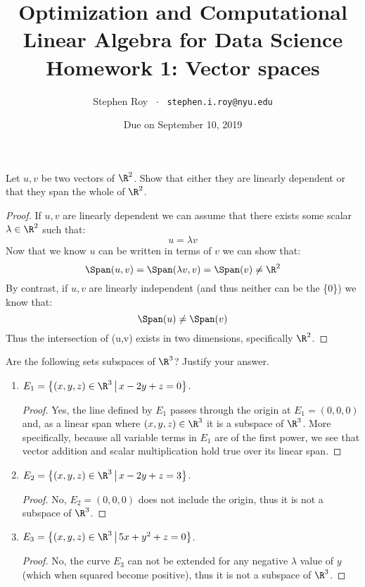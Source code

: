 \documentclass[11pt,nocut]{article}
\title{\vspace{-2.0cm}%
	Optimization and Computational Linear Algebra for Data Science\\
Homework 1: Vector spaces}
\author{\vspace{1cm}Stephen Roy \ $\cdot$ \ \texttt{stephen.i.roy@nyu.edu}}
\date{\vspace{-1cm}Due on September 10, 2019}
\begin{document}
\maketitle



\begin{problem}[2 points]
	Let $u,v$ be two vectors of $\R^2$. Show that either they are linearly dependent or that they span the whole of $\R^2$.
\end{problem}
\begin{proof}
If $u,v$ are linearly dependent we can assume that there exists some scalar $\lambda \in \R^2$ such that:
$$
u = \lambda v
$$
Now that we know $u$ can be written in terms of $v$ we can show that:
$$
\Span(u,v) = \Span(\lambda v,v) = \Span(v) \neq\R^2
$$
By contrast, if $u,v$ are linearly independent (and thus neither can be the \{0\}) we know that:
$$
\Span(u) \neq \Span(v)
$$
Thus the intersection of \Span(u,v) exists in two dimensions, specifically $\R^2$.
\end{proof}	

\vspace{1mm}

\begin{problem}[3 points]
	Are the following sets subspaces of $\R^3$? Justify your answer.
	\begin{enumerate}[label=\normalfont(\textbf{\alph*})]
		\item $E_1= \big\{ (x,y,z) \in \R^3 \, \big| \, x - 2y + z= 0 \big\}$.\\
		\begin{proof} Yes, the line defined by $E_1$ passes through the origin at $E_1=(0,0,0)$ and, as a linear span where $(x,y,z)\in \R^3$ it is a subspace of $\R^3$. More specifically, because all variable terms in $E_1$ are of the first power, we see that vector addition and scalar multiplication hold true over its linear span.\end{proof}
		\item $E_2= \big\{ (x,y,z) \in \R^3 \, \big| \, x - 2y + z= 3 \big\}$.\\
		\begin{proof}No, $E_2=(0,0,0)$ does not include the origin, thus it is not a subspace of $\R^3$.\end{proof}
		\item $E_3= \big\{ (x,y,z) \in \R^3 \, \big| \, 5x + y^2 + z= 0 \big\}$.\\
		\begin{proof}No, the curve $E_3$ can not be extended for any negative $\lambda$ value of $y$ (which when squared become positive), thus it is not a subspace of $\R^3$.\end{proof}
	\end{enumerate}
\end{problem}
\end{document}
